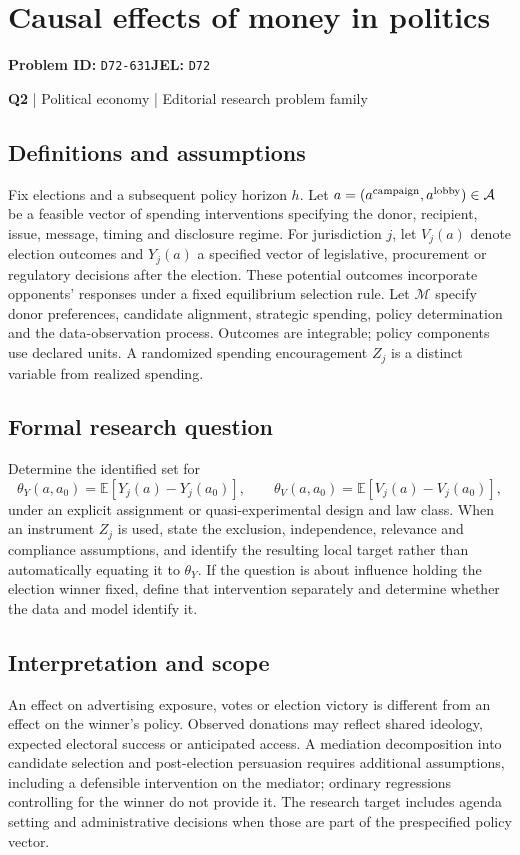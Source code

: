 \documentclass[11pt,a4paper]{article}
\begin{document}
\section*{Causal effects of money in politics}
\textbf{Problem ID:} \texttt{D72-631}\quad \textbf{JEL:} \texttt{D72}\par
\label{problem:OP-0122}
\label{atlas:prob:Q2}
{\sffamily\small\color{muted}\textbf{Q2} | Political economy | Editorial research problem family\par}
\subsection*{Definitions and assumptions}
Fix elections and a subsequent policy horizon $h$. Let $a=(a^{\rm campaign},a^{\rm lobby})\in\mathcal A$ be a feasible vector of spending interventions specifying the donor, recipient, issue, message, timing and disclosure regime. For jurisdiction $j$, let $V_j(a)$ denote election outcomes and $Y_j(a)$ a specified vector of legislative, procurement or regulatory decisions after the election. These potential outcomes incorporate opponents' responses under a fixed equilibrium selection rule. Let $\mathcal M$ specify donor preferences, candidate alignment, strategic spending, policy determination and the data-observation process. Outcomes are integrable; policy components use declared units. A randomized spending encouragement $Z_j$ is a distinct variable from realized spending.
\subsection*{Formal research question}
Determine the identified set for
\[
\theta_Y(a,a_0)=\mathbb E[Y_j(a)-Y_j(a_0)],\qquad
\theta_V(a,a_0)=\mathbb E[V_j(a)-V_j(a_0)],
\]
under an explicit assignment or quasi-experimental design and law class. When an instrument $Z_j$ is used, state the exclusion, independence, relevance and compliance assumptions, and identify the resulting local target rather than automatically equating it to $\theta_Y$. If the question is about influence holding the election winner fixed, define that intervention separately and determine whether the data and model identify it.
\subsection*{Interpretation and scope}
An effect on advertising exposure, votes or election victory is different from an effect on the winner's policy. Observed donations may reflect shared ideology, expected electoral success or anticipated access. A mediation decomposition into candidate selection and post-election persuasion requires additional assumptions, including a defensible intervention on the mediator; ordinary regressions controlling for the winner do not provide it. The research target includes agenda setting and administrative decisions when those are part of the prespecified policy vector.
\end{document}
